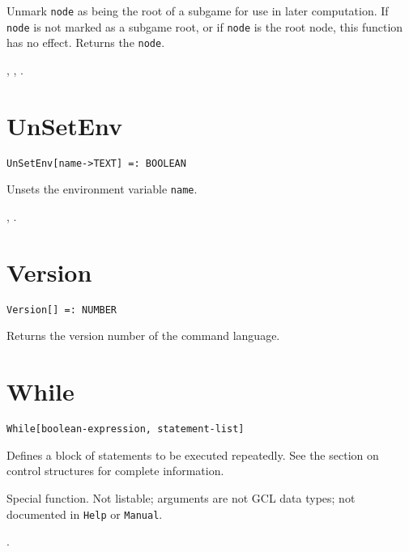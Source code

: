 \noindent
Unmark \verb+node+ as being the root of a subgame for use in later
computation.  If \verb+node+ is not marked as a subgame root, or if
\verb+node+ is the root node, this function has no effect.  Returns
the \verb+node+.

\seealso {},
,
.


\section*{UnSetEnv}\label{PrimUnSetEnv}
\begin{verbatim}
UnSetEnv[name->TEXT] =: BOOLEAN 
\end{verbatim}

\noindent
Unsets the environment variable \verb+name+.

\seealso {}, .


\section*{Version}\label{PrimVersion}
\begin{verbatim}
Version[] =: NUMBER 
\end{verbatim} 

\noindent
Returns the version number of the command language.



\section*{While}\label{PrimWhile}
\begin{verbatim}
While[boolean-expression, statement-list]
\end{verbatim}
  
\noindent
Defines a block of statements to be executed repeatedly.
See the section on control structures for complete information.

\note Special function.  Not listable; arguments are not GCL
data types; not documented in \verb+Help+ or \verb+Manual+.  

\seealso {}.

